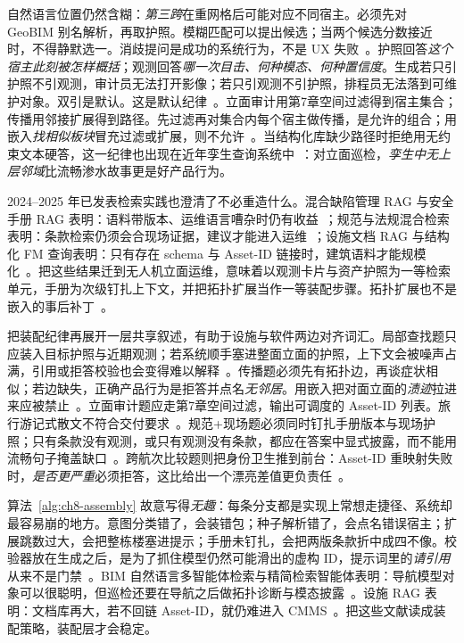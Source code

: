 自然语言位置仍然含糊：\emph{第三跨}在重网格后可能对应不同宿主。必须先对 GeoBIM 别名解析，再取护照。模糊匹配可以提出候选；当两个候选分数接近时，不得静默选一。消歧提问是成功的系统行为，不是 UX 失败~\cite{zhang2025,han2025,guo2025bimllmquery}。护照回答\emph{这个宿主此刻被怎样概括}；观测回答\emph{哪一次目击、何种模态、何种置信度}。生成若只引护照不引观测，审计员无法打开影像；若只引观测不引护照，排程员无法落到可维护对象。双引是默认。这是默认纪律~\cite{pan2024b,zhao2026physical}。立面审计用第7章空间过滤得到宿主集合；传播用邻接扩展得到路径。先过滤再对集合内每个宿主做传播，是允许的组合；用嵌入\emph{找相似板块}冒充过滤或扩展，则不允许~\cite{peng2024,zhang2025}。当结构化库缺少路径时拒绝用无约束文本硬答，这一纪律也出现在近年孪生查询系统中~\cite{pan2026graphdtgpt,buga2025llmfmsql}：对立面巡检，\emph{孪生中无上层邻域}比流畅渗水故事更是好产品行为。

2024--2025 年已发表检索实践也澄清了不必重造什么。混合缺陷管理 RAG 与安全手册 RAG 表明：语料带版本、运维语言嘈杂时仍有收益~\cite{jeon2025hybridrag,lee2024ragsafety}；规范与法规混合检索表明：条款检索仍须会合现场证据，建议才能进入运维~\cite{joffe2025buildingcodes,he2025regulationhybrid,yang2024promptcode}；设施文档 RAG 与结构化 FM 查询表明：只有存在 schema 与 Asset-ID 链接时，建筑语料才能规模化~\cite{krutli2025fmrags,buga2025llmfmsql,arslan2024ragenergy}。把这些结果迁到无人机立面运维，意味着以观测卡片与资产护照为一等检索单元，手册为次级钉扎上下文，并把拓扑扩展当作一等装配步骤。拓扑扩展也不是嵌入的事后补丁~\cite{peng2024,pan2024b,ma2026tenquestions}。




把装配纪律再展开一层共享叙述，有助于设施与软件两边对齐词汇。局部查找题只应装入目标护照与近期观测；若系统顺手塞进整面立面的护照，上下文会被噪声占满，引用或拒答校验也会变得难以解释~\cite{lewis2020,peng2024}。传播题必须先有拓扑边，再谈症状相似；若边缺失，正确产品行为是拒答并点名\emph{无邻居}。用嵌入把对面立面的\emph{渍迹}拉进来应被禁止~\cite{peng2024,jeon2025hybridrag,pan2026graphdtgpt}。立面审计题应走第7章空间过滤，输出可调度的 Asset-ID 列表。旅行游记式散文不符合交付要求~\cite{zhang2025,buga2025llmfmsql}。规范+现场题必须同时钉扎手册版本与现场护照；只有条款没有观测，或只有观测没有条款，都应在答案中显式披露，而不能用流畅句子掩盖缺口~\cite{joffe2025buildingcodes,lee2024ragsafety,he2025regulationhybrid,quan2026bimfacrag}。跨航次比较题则把身份卫生推到前台：Asset-ID 重映射失败时，\emph{是否更严重}必须拒答，这比给出一个漂亮差值更负责任~\cite{zhang2025,yang2025detreconreg,zhao2026physical}。

算法~\ref{alg:ch8-assembly} 故意写得\emph{无趣}：每条分支都是实现上常想走捷径、系统却最容易崩的地方。意图分类错了，会装错包；种子解析错了，会点名错误宿主；扩展跳数过大，会把整栋楼塞进提示；手册未钉扎，会把两版条款折中成四不像。校验器放在生成之后，是为了抓住模型仍然可能滑出的虚构 ID，提示词里的\emph{请引用}从来不是门禁~\cite{ji2023,liang2023helm,ma2026tenquestions}。BIM 自然语言多智能体检索与精简检索智能体表明：导航模型对象可以很聪明，但巡检还要在导航之后做拓扑诊断与模态披露~\cite{hellin2025bimmas,koh2026bimllmretr,liu2025bimcoder}。设施 RAG 表明：文档库再大，若不回链 Asset-ID，就仍难进入 CMMS~\cite{krutli2025fmrags,quan2026bimfacrag,arslan2024ragenergy}。把这些文献读成装配策略，装配层才会稳定。




